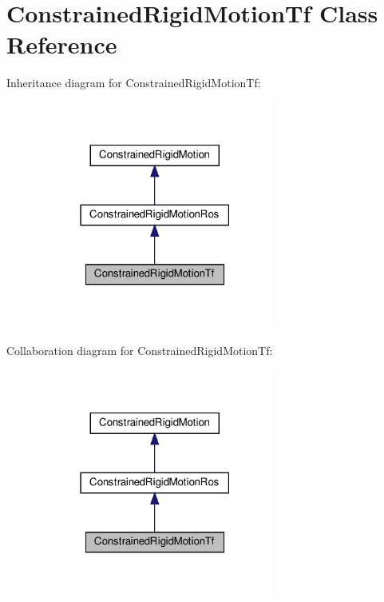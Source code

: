 \hypertarget{classConstrainedRigidMotionTf}{}\section{Constrained\+Rigid\+Motion\+Tf Class Reference}
\label{classConstrainedRigidMotionTf}


Inheritance diagram for Constrained\+Rigid\+Motion\+Tf\+:\nopagebreak
\begin{figure}[H]
\begin{center}
\leavevmode
\includegraphics[width=219pt]{d2/d01/classConstrainedRigidMotionTf__inherit__graph}
\end{center}
\end{figure}


Collaboration diagram for Constrained\+Rigid\+Motion\+Tf\+:\nopagebreak
\begin{figure}[H]
\begin{center}
\leavevmode
\includegraphics[width=219pt]{dc/ddf/classConstrainedRigidMotionTf__coll__graph}
\end{center}
\end{figure}
